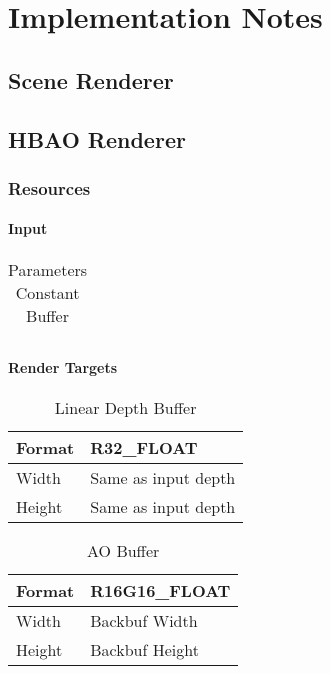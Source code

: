 \documentclass[a4paper,12pt]{article}
\begin{document}
\chapter{Implementation Notes}
\label{sec:ImplementationNotes}

\section{Scene Renderer}
\label{sec:SceneRenderer}

\section{HBAO Renderer}
\label{sec:HBAORenderer}

\subsection{Resources}
\label{sec:Resources}

\subsubsection{Input}
\label{sec:Input}

\begin{table}[htbp]
	\centering
		\begin{tabular} {l|l}
		\end{tabular}
	\caption{Parameters Constant Buffer}
	\label{tab:ParametersConstantBuffer}
\end{table}

\begin{table}[htbp]
	\centering
		\begin{tabular} [l|l}
			
		\end{tabular}
	\caption{Input Depth Buffer (Non-linear)}
	\label{tab:InputDepthBuffer}
\end{table} 
\subsubsection{Render Targets}
\label{sec:RenderTargets}

\begin{table*}[htbp]
	\centering
		\begin{tabular} {l|l}
			\hline Format & R32\_FLOAT \\
			\hline Width & Same as input depth \\ 
			\hline Height & Same as input depth \\
		\end{tabular}
	\caption{Linear Depth Buffer}
	\label{tab:LinearDepth}
\end{table*}

\begin{table}[h]
	\centering
		\begin{tabular} {l|l}
			\toprule
			\hline Format & R16G16\_FLOAT \\ 
			\hline Width & Backbuf Width \\
			\hline Height & Backbuf Height \\ 
		\end{tabular}
	\caption{AO Buffer}
	\label{tab:AOBuffer}
\end{table}
\end{document}
